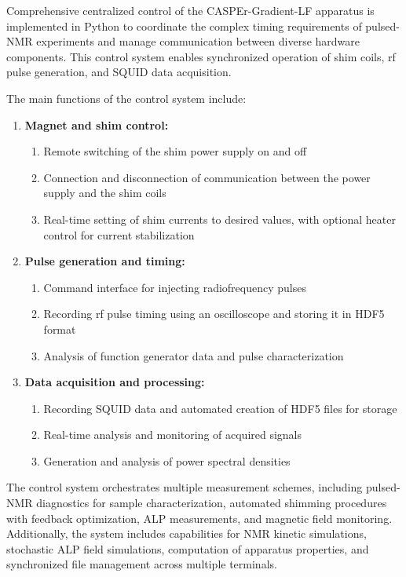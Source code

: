 Comprehensive centralized control of the CASPEr-Gradient-LF apparatus is implemented in Python to coordinate the complex timing requirements of pulsed-NMR experiments and manage communication between diverse hardware components.
This control system enables synchronized operation of shim coils, rf pulse generation, and SQUID data acquisition.

The main functions of the control system include:

\begin{enumerate}
    \item \textbf{Magnet and shim control:}
    \begin{enumerate}
        \item Remote switching of the shim power supply on and off
        \item Connection and disconnection of communication between the power supply and the shim coils
        \item Real-time setting of shim currents to desired values, with optional heater control for current stabilization
    \end{enumerate}
    \item \textbf{Pulse generation and timing:}
    \begin{enumerate}
        \item Command interface for injecting radiofrequency pulses
        \item Recording rf pulse timing using an oscilloscope and storing it in HDF5 format
        \item Analysis of function generator data and pulse characterization
    \end{enumerate}
    \item \textbf{Data acquisition and processing:}
    \begin{enumerate}
        \item Recording SQUID data and automated creation of HDF5 files for storage
        \item Real-time analysis and monitoring of acquired signals
        \item Generation and analysis of power spectral densities
    \end{enumerate}
\end{enumerate}

The control system orchestrates multiple measurement schemes, including pulsed-NMR diagnostics for sample characterization, automated shimming procedures with feedback optimization, ALP measurements, and magnetic field monitoring.
Additionally, the system includes capabilities for NMR kinetic simulations, stochastic ALP field simulations, computation of apparatus properties, and synchronized file management across multiple terminals.


